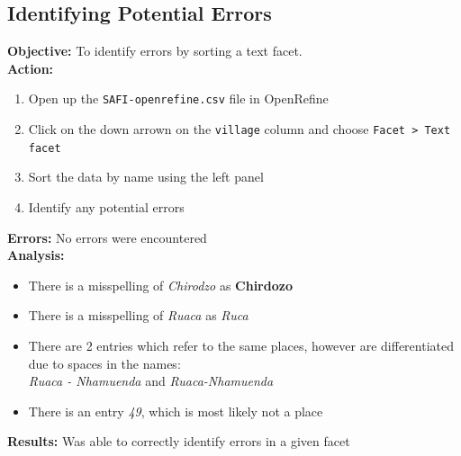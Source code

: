 \documentclass{article}
\begin{document}
\subsection{Identifying Potential Errors}
\textbf{Objective:} To identify errors by sorting a text facet.\\
\textbf{Action:}
\begin{enumerate}
    \item Open up the \texttt{SAFI-openrefine.csv} file in OpenRefine
    \item Click on the down arrown on the \texttt{village} column and choose \texttt{Facet > Text facet}
    \item Sort the data by name using the left panel
    \item Identify any potential errors
\end{enumerate}
\textbf{Errors:} No errors were encountered\\
\textbf{Analysis:}
\begin{itemize}
    \item There is a misspelling of \textit{Chirodzo} as \textbf{Chirdozo}
    \item There is a misspelling of \textit{Ruaca} as \textit{Ruca}
    \item There are 2 entries which refer to the same places, however are differentiated due to spaces in the names:\\
    \textit{Ruaca - Nhamuenda} and \textit{Ruaca-Nhamuenda}
    \item There is an entry \textit{49}, which is most likely not a place
\end{itemize}
\textbf{Results:} Was able to correctly identify errors in a given facet
\end{document}
